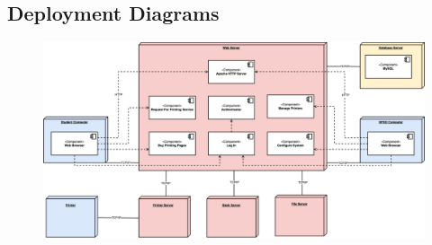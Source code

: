 \subsection{Deployment Diagrams}
        \begin{center}
        \begin{figure}[!htp]
        \begin{center}
         \includegraphics[scale=0.3]{images/Task3/Deployment Diagram/DeploymentDiagram(v1).drawio.png}
        \end{center}
        \end{figure}
        \end{center}

